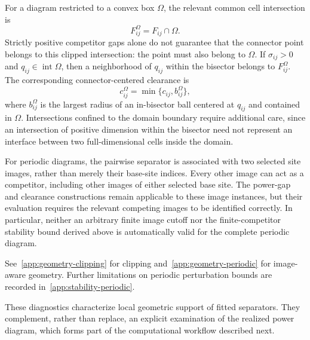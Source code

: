 For a diagram restricted to a convex box $\Omega$, the relevant common cell intersection is
\begin{equation}
F_{ij}^{\Omega}=F_{ij}\cap\Omega.
\label{eq:clipped-face}
\end{equation}
Strictly positive competitor gaps alone do not guarantee that the connector point belongs to this clipped intersection: the point must also belong to $\Omega$. If $\sigma_{ij}>0$ and $q_{ij}\in\operatorname{int}\Omega$, then a neighborhood of $q_{ij}$ within the bisector belongs to $F_{ij}^{\Omega}$. The corresponding connector-centered clearance is
\begin{equation}
c_{ij}^{\Omega}
=\min\{c_{ij},b_{ij}^{\Omega}\},
\label{eq:clipped-clearance}
\end{equation}
where $b_{ij}^{\Omega}$ is the largest radius of an in-bisector ball centered at $q_{ij}$ and contained in $\Omega$. Intersections confined to the domain boundary require additional care, since an intersection of positive dimension within the bisector need not represent an interface between two full-dimensional cells inside the domain.

For periodic diagrams, the pairwise separator is associated with two selected site images, rather than merely their base-site indices. Every other image can act as a competitor, including other images of either selected base site. The power-gap and clearance constructions remain applicable to these image instances, but their evaluation requires the relevant competing images to be identified correctly. In particular, neither an arbitrary finite image cutoff nor the finite-competitor stability bound derived above is automatically valid for the complete periodic diagram.

See~\ref{app:geometry-clipping} for clipping and~\ref{app:geometry-periodic} for image-aware geometry. Further limitations on periodic perturbation bounds are recorded in~\ref{app:stability-periodic}.

These diagnostics characterize local geometric support of fitted separators. They complement, rather than replace, an explicit examination of the realized power diagram, which forms part of the computational workflow described next.
